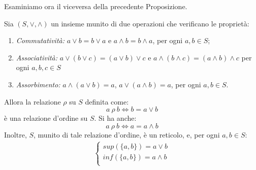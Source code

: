 Esaminiamo ora il viceversa della precedente Proposizione.
\begin{propbox}
	Sia $(S,\vee,\wedge)$ un insieme munito di due operazioni che verificano le proprietà:
	\begin{enumerate}
		\item \textit{Commutatività:} $a \vee b = b \vee a$ e $a \wedge b = b \wedge a$, per ogni $a,b \in S$;
		\item \textit{Associatività:} $a \vee (b \vee c) = (a \vee b) \vee c$ e $a \wedge (b \wedge c) = (a \wedge b) \wedge c$ per ogni $a,b,c \in S$
		\item \textit{Assorbimento:} $a \wedge ( a \vee b) = a$, $a \vee (a \wedge b) = a$, per ogni $a,b \in S$.
	\end{enumerate}
Allora la relazione $\rho$ su $S$ definita come:
\begin{equation}
	a \ \rho \ b \iff b = a \vee b
\end{equation}
è una relazione d'ordine su $S$. Si ha anche:
\begin{equation}\label{eq:wedge}
	a \ \rho \ b \iff a = a \wedge b
\end{equation}
Inoltre, $S$, munito di tale relazione d'ordine, è un reticolo, e, per ogni $a,b \in S$:
\begin{align*}
	\begin{cases*}
		sup(\{a,b\}) = a \vee b \\
		inf(\{a,b\}) = a \wedge b \\
	\end{cases*}
\end{align*}
\end{propbox}
